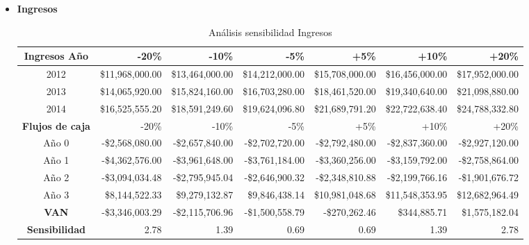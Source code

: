 \begin{enumerate}[(a)]
          \begin{itemize}
              \item {\bf Ingresos}\\
                \begin{table}[h!t]
                    \centering
                    \scriptsize
                    \begin{tabular}{|c|r|r|r|r|r|r|}
                        \hline
                        {\bf Ingresos Año}   & -20\%           & -10\%           & -5\%            & +5\%            & +10\%           & +20\% \\\hline
                        2012                 & \$11,968,000.00 & \$13,464,000.00 & \$14,212,000.00 & \$15,708,000.00 & \$16,456,000.00 & \$17,952,000.00 \\ \hline
                        2013                 & \$14,065,920.00 & \$15,824,160.00 & \$16,703,280.00 & \$18,461,520.00 & \$19,340,640.00 & \$21,098,880.00 \\ \hline
                        2014                 & \$16,525,555.20 & \$18,591,249.60 & \$19,624,096.80 & \$21,689,791.20 & \$22,722,638.40 & \$24,788,332.80 \\ \hline
                        \hline
                        {\bf Flujos de caja} & -20\%           & -10\%           & -5\%            & +5\%            & +10\%           & +20\% \\\hline
                        Año 0                & -\$2,568,080.00 & -\$2,657,840.00 & -\$2,702,720.00 & -\$2,792,480.00 & -\$2,837,360.00 & -\$2,927,120.00\\\hline
                        Año 1                & -\$4,362,576.00 & -\$3,961,648.00 & -\$3,761,184.00 & -\$3,360,256.00 & -\$3,159,792.00 & -\$2,758,864.00\\\hline
                        Año 2                & -\$3,094,034.48 & -\$2,795,945.04 & -\$2,646,900.32 & -\$2,348,810.88 & -\$2,199,766.16 & -\$1,901,676.72\\\hline
                        Año 3                & \$8,144,522.33  & \$9,279,132.87  & \$9,846,438.14  & \$10,981,048.68 & \$11,548,353.95 & \$12,682,964.49\\\hline
                        \hline
                        {\bf VAN }           & -\$3,346,003.29 & -\$2,115,706.96 & -\$1,500,558.79 & -\$270,262.46   & \$344,885.71    & \$1,575,182.04 \\\hline
                        {\bf Sensibilidad}   & 2.78            & 1.39            & 0.69            & 0.69            & 1.39            & 2.78 \\\hline
                    \end{tabular}
                    \caption{Análisis sensibilidad Ingresos}
                \end{table}
                

\end{itemize}
\end{enumerate}
